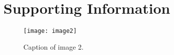 \chapter{Supporting Information}\label{app:app1}

\begin{figure}[h]
	\centering
	\texttt{[image: image2]}
	\caption{Caption of image 2.}
	\label{fig: img2}
\end{figure}
